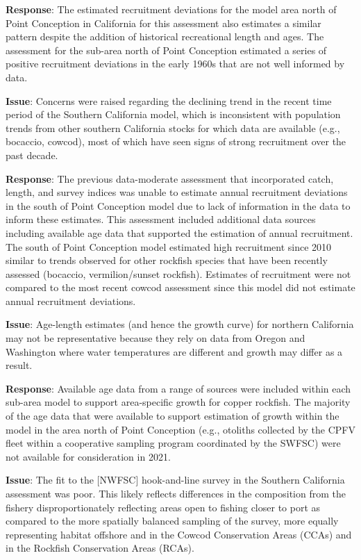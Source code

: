 \documentclass[11pt,
  letterpaper,
]{article}
\begin{document}
\textbf{Response}: The estimated recruitment deviations for the model area north of Point Conception in California for this assessment also estimates a similar pattern despite the addition of historical recreational length and ages. The assessment for the sub-area north of Point Conception estimated a series of positive recruitment deviations in the early 1960s that are not well informed by data.

\textbf{Issue}: Concerns were raised regarding the declining trend in the recent time period of the Southern California model, which is inconsistent with population trends from other southern California stocks for which data are available (e.g., bocaccio, cowcod), most of which have seen signs of strong recruitment over the past decade.

\textbf{Response}: The previous data-moderate assessment that incorporated catch, length, and survey indices was unable to estimate annual recruitment deviations in the south of Point Conception model due to lack of information in the data to inform these estimates. This assessment included additional data sources including available age data that supported the estimation of annual recruitment. The south of Point Conception model estimated high recruitment since 2010 similar to trends observed for other rockfish species that have been recently assessed (bocaccio, vermilion/sunset rockfish). Estimates of recruitment were not compared to the most recent cowcod assessment since this model did not estimate annual recruitment deviations.

\textbf{Issue}: Age-length estimates (and hence the growth curve) for northern California may not be representative because they rely on data from Oregon and Washington where water temperatures are different and growth may differ as a result.

\textbf{Response}: Available age data from a range of sources were included within each sub-area model to support area-specific growth for copper rockfish. The majority of the age data that were available to support estimation of growth within the model in the area north of Point Conception (e.g., otoliths collected by the CPFV fleet within a cooperative sampling program coordinated by the SWFSC) were not available for consideration in 2021.

\textbf{Issue}: The fit to the {[}NWFSC{]} hook-and-line survey in the Southern California assessment was poor. This likely reflects differences in the composition from the fishery disproportionately reflecting areas open to fishing closer to port as compared to the more spatially balanced sampling of the survey, more equally representing habitat offshore and in the Cowcod Conservation Areas (CCAs) and in the Rockfish Conservation Areas (RCAs).
\end{document}
